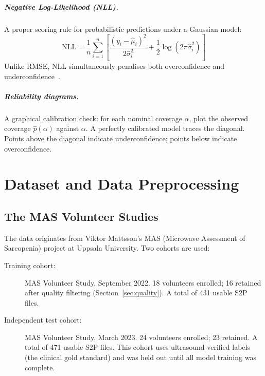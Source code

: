 \documentclass[12pt, a4paper, oneside]{report}
\begin{document}
\paragraph{Negative Log-Likelihood (NLL).} A proper scoring rule for probabilistic predictions under a Gaussian model:
\begin{equation}
  \mathrm{NLL} = \frac{1}{n}\sum_{i=1}^n \left[\frac{(y_i - \hat\mu_i)^2}{2\hat\sigma_i^2} + \frac{1}{2}\log(2\pi\hat\sigma_i^2)\right]
\end{equation}
Unlike RMSE, NLL simultaneously penalises both overconfidence and underconfidence~\cite{gneiting2007}.

\paragraph{Reliability diagrams.} A graphical calibration check: for each nominal coverage $\alpha$, plot the observed coverage $\hat{p}(\alpha)$ against $\alpha$. A perfectly calibrated model traces the diagonal. Points above the diagonal indicate underconfidence; points below indicate overconfidence.

\chapter{Dataset and Data Preprocessing}
\label{ch:data}

\section{The MAS Volunteer Studies}

The data originates from Viktor Mattsson's MAS (Microwave Assessment of Sarcopenia) project at Uppsala University. Two cohorts are used:

\begin{description}
  \item[Training cohort:] MAS Volunteer Study, September 2022. 18 volunteers enrolled; 16 retained after quality filtering (Section~\ref{sec:quality}). A total of 431 usable S2P files.
  \item[Independent test cohort:] MAS Volunteer Study, March 2023. 24 volunteers enrolled; 23 retained. A total of 471 usable S2P files. This cohort uses ultrasound-verified labels (the clinical gold standard) and was held out until all model training was complete.
\end{description}
\end{document}
